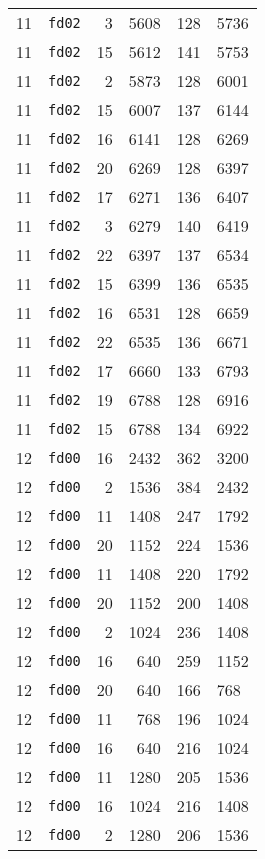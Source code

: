 \documentclass{article}
\begin{document}
\begin{table}[h!]
\begin{tabular}{llrrrl}
    11 & \texttt{fd02} & 3 & 5608 & 128 & 5736 \\
    11 & \texttt{fd02} & 15 & 5612 & 141 & 5753 \\
    11 & \texttt{fd02} & 2 & 5873 & 128 & 6001 \\
    11 & \texttt{fd02} & 15 & 6007 & 137 & 6144 \\
    11 & \texttt{fd02} & 16 & 6141 & 128 & 6269 \\
    11 & \texttt{fd02} & 20 & 6269 & 128 & 6397 \\
    11 & \texttt{fd02} & 17 & 6271 & 136 & 6407 \\
    11 & \texttt{fd02} & 3 & 6279 & 140 & 6419 \\
    11 & \texttt{fd02} & 22 & 6397 & 137 & 6534 \\
    11 & \texttt{fd02} & 15 & 6399 & 136 & 6535 \\
    11 & \texttt{fd02} & 16 & 6531 & 128 & 6659 \\
    11 & \texttt{fd02} & 22 & 6535 & 136 & 6671 \\
    11 & \texttt{fd02} & 17 & 6660 & 133 & 6793 \\
    11 & \texttt{fd02} & 19 & 6788 & 128 & 6916 \\
    11 & \texttt{fd02} & 15 & 6788 & 134 & 6922 \\
    12 & \texttt{fd00} & 16 & 2432 & 362 & 3200 \\
    12 & \texttt{fd00} & 2 & 1536 & 384 & 2432 \\
    12 & \texttt{fd00} & 11 & 1408 & 247 & 1792 \\
    12 & \texttt{fd00} & 20 & 1152 & 224 & 1536 \\
    12 & \texttt{fd00} & 11 & 1408 & 220 & 1792 \\
    12 & \texttt{fd00} & 20 & 1152 & 200 & 1408 \\
    12 & \texttt{fd00} & 2 & 1024 & 236 & 1408 \\
    12 & \texttt{fd00} & 16 & 640 & 259 & 1152 \\
    12 & \texttt{fd00} & 20 & 640 & 166 & 768 \\
    12 & \texttt{fd00} & 11 & 768 & 196 & 1024 \\
    12 & \texttt{fd00} & 16 & 640 & 216 & 1024 \\
    12 & \texttt{fd00} & 11 & 1280 & 205 & 1536 \\
    12 & \texttt{fd00} & 16 & 1024 & 216 & 1408 \\
    12 & \texttt{fd00} & 2 & 1280 & 206 & 1536 \\

\end{tabular}
\end{table}
\end{document}
